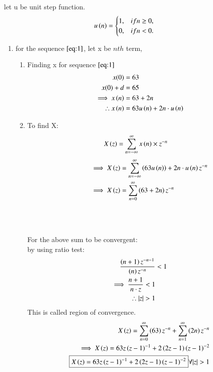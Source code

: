 \documentclass[journal,12pt,twocolumn]{IEEEtran}
\theoremstyle{remark}
\begin{document}
let u be unit step function.\\
\begin{align}
u\left(n\right) &=
\begin{cases}
1, & if  n \geq 0, \\
0, & if  n < 0.
\end{cases}
\end{align}
\begin{enumerate}
\item
for the sequence $ \eqref{eq:1}$, let x be $ nth$ term, 
\begin{enumerate}
\item
Finding x for sequence $ \eqref{eq:1}$
\begin{align}
x(0) &= 63\\
x(0)+d &= 65\\
\implies x\left(n\right) &= 63 + 2n \label{eq:3}\\
\therefore x\left(n\right) &= 63u\left(n\right) + 2n\cdot u\left(n\right)
\end{align}
\item
To find X:
\begin{align}
X\left(z\right) &= \sum_{n=-\infty}^{\infty} x\left(n\right)\times z^{-n}
\end{align}
\begin{align}
\implies X\left(z\right) &= \sum_{n=-\infty}^{\infty} \left(63u\left(n\right)\right) + 2n\cdot u\left(n\right)z^{-n}\\
\hspace{1cm}
\implies X\left(z\right) &= \sum_{n=0}^{\infty} \left(63 + 2n\right)z^{-n}
\end{align}
\\\\\\
For the above sum to be convergent:\\
by using ratio test:\\
\begin{align}
    \frac{\brak{n+1}z^{-n-1}}{\brak{n}z^{-n}} &<1\\
   \implies \frac{n+1}{n\cdot z}<1\\
   \therefore |z|>1
\end{align}
This is called region of convergence.\\
\begin{align}
X\brak{z} = \sum_{n=0}^{\infty} \brak{63}z^{-n}+\sum_{n=1}^{\infty}\brak{2n}z^{-n}\\
\implies X\brak{z} = 63z\brak{z-1}^{-1} + 2\brak{2z-1}\brak{z-1}^{-2}\\
\boxed{X\brak{z} = 63z\brak{z-1}^{-1} + 2\brak{2z-1}\brak{z-1}^{-2}}  \forall  |z|>1 \label{eq:5}

\end{align}
\end{enumerate}
\end{enumerate}
\end{document}
